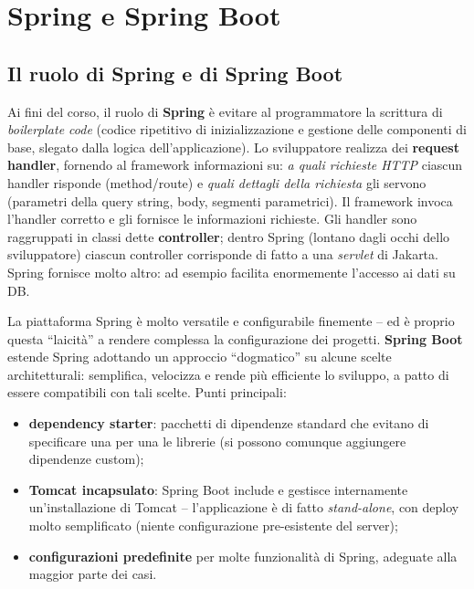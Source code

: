 \chapter{Spring e Spring Boot}

\section{Il ruolo di Spring e di Spring Boot}

\begin{definizione}[Spring]
Ai fini del corso, il ruolo di \textbf{Spring} \`e evitare al programmatore la scrittura di
\emph{boilerplate code} (codice ripetitivo di inizializzazione e gestione delle componenti di
base, slegato dalla logica dell'applicazione). Lo sviluppatore realizza dei
\textbf{request handler}, fornendo al framework informazioni su: \emph{a quali richieste
HTTP} ciascun handler risponde (method/route) e \emph{quali dettagli della richiesta} gli
servono (parametri della query string, body, segmenti parametrici). Il framework invoca
l'handler corretto e gli fornisce le informazioni richieste. Gli handler sono raggruppati in
classi dette \textbf{controller}; dentro Spring (lontano dagli occhi dello sviluppatore)
ciascun controller corrisponde di fatto a una \emph{servlet} di Jakarta. Spring fornisce
molto altro: ad esempio facilita enormemente l'accesso ai dati su DB.
\end{definizione}

\begin{definizione}
La piattaforma Spring \`e molto versatile e configurabile finemente -- ed \`e proprio questa
``laicit\`a'' a rendere complessa la configurazione dei progetti. \textbf{Spring Boot}
estende Spring adottando un approccio ``dogmatico'' su alcune scelte architetturali:
semplifica, velocizza e rende pi\`u efficiente lo sviluppo, a patto di essere compatibili con
tali scelte. Punti principali:
\begin{itemize}
  \item \textbf{dependency starter}: pacchetti di dipendenze standard che evitano di
        specificare una per una le librerie (si possono comunque aggiungere dipendenze
        custom);
  \item \textbf{Tomcat incapsulato}: Spring Boot include e gestisce internamente
        un'installazione di Tomcat -- l'applicazione \`e di fatto \emph{stand-alone}, con
        deploy molto semplificato (niente configurazione pre-esistente del server);
  \item \textbf{configurazioni predefinite} per molte funzionalit\`a di Spring, adeguate alla
        maggior parte dei casi.
\end{itemize}
\end{definizione}

